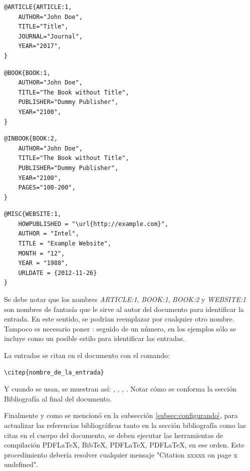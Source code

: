 \begin{lstlisting}
@ARTICLE{ARTICLE:1,
    AUTHOR="John Doe",
    TITLE="Title",
    JOURNAL="Journal",
    YEAR="2017",
}
\end{lstlisting}

\begin{lstlisting}
@BOOK{BOOK:1,
    AUTHOR="John Doe",
    TITLE="The Book without Title",
    PUBLISHER="Dummy Publisher",
    YEAR="2100",
}
\end{lstlisting}

\begin{lstlisting}
@INBOOK{BOOK:2,
    AUTHOR="John Doe",
    TITLE="The Book without Title",
    PUBLISHER="Dummy Publisher",
    YEAR="2100",
    PAGES="100-200",
}
\end{lstlisting}

\begin{lstlisting}
@MISC{WEBSITE:1,
    HOWPUBLISHED = "\url{http://example.com}",
    AUTHOR = "Intel",
    TITLE = "Example Website",
    MONTH = "12",
    YEAR = "1988",
    URLDATE = {2012-11-26}
}
\end{lstlisting}

Se debe notar que los nombres \emph{ARTICLE:1}, \emph{BOOK:1}, \emph{BOOK:2} y
\emph{WEBSITE:1} son nombres de fantasía que le sirve al autor del documento
para identificar la entrada. En este sentido, se podrían reemplazar por
cualquier otro nombre. Tampoco es necesario poner : seguido de un número, en
los ejemplos sólo se incluye como un posible estilo para identificar las
entradas.

La entradas se citan en el documento con el comando:

\begin{verbatim}
\citep{nombre_de_la_entrada}
\end{verbatim}

Y cuando se usan, se muestran así: \citep{ARTICLE:1}, \citep{BOOK:1},
\citep{BOOK:2}, \citep{WEBSITE:1}. Notar cómo se conforma la sección
Bibliografía al final del documento.

Finalmente y como se mencionó en la subsección \ref{subsec:configurando}, para
actualizar las referencias bibliográficas tanto en la sección bibliografía como
las citas en el cuerpo del documento, se deben ejecutar las herramientas de
compilación PDFLaTeX, BibTeX, PDFLaTeX, PDFLaTeX, en ese orden. Este
procedimiento debería resolver cualquier mensaje "Citation xxxxx on page x
undefined".
